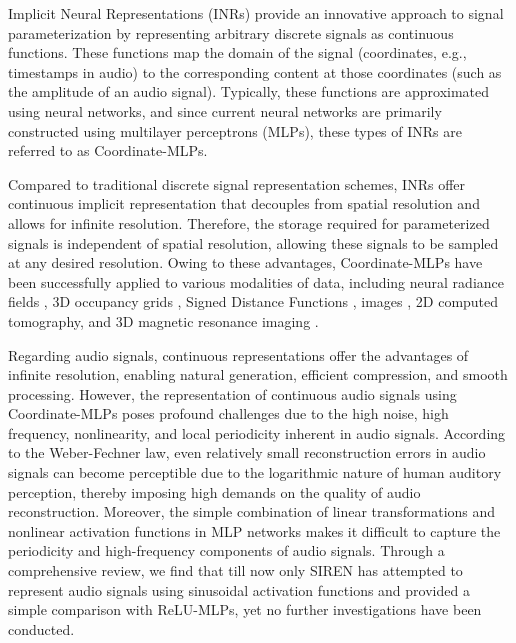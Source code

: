 \documentclass[letterpaper]{article} %
\begin{document}
Implicit Neural Representations (INRs) provide an innovative approach to signal parameterization by representing arbitrary discrete signals as continuous functions. These functions map the domain of the signal (coordinates, e.g., timestamps in audio) to the corresponding content at those coordinates (such as the amplitude of an audio signal). Typically, these functions are approximated using neural networks, and since current neural networks are primarily constructed using multilayer perceptrons (MLPs), these types of INRs are referred to as Coordinate-MLPs.

Compared to traditional discrete signal representation schemes, INRs offer continuous implicit representation that decouples from spatial resolution and allows for infinite resolution. Therefore, the storage required for parameterized signals is independent of spatial resolution, allowing these signals to be sampled at any desired resolution. Owing to these advantages, Coordinate-MLPs have been successfully applied to various modalities of data, including neural radiance fields \cite{mildenhall2020nerf}, 3D occupancy grids \cite{mescheder2019occupancynet}, Signed Distance Functions \cite{park2019deepsdf}, images \cite{sitzmann2020siren}, 2D computed tomography, and 3D magnetic resonance imaging \cite{tancik2020ffn, saragadam2023wire, kazerouni2023incode}.

Regarding audio signals, continuous representations offer the advantages of infinite resolution, enabling natural generation, efficient compression, and smooth processing. However, the representation of continuous audio signals using Coordinate-MLPs poses profound challenges due to the high noise, high frequency, nonlinearity, and local periodicity inherent in audio signals. According to the Weber-Fechner law, even relatively small reconstruction errors in audio signals can become perceptible due to the logarithmic nature of human auditory perception, thereby imposing high demands on the quality of audio reconstruction. Moreover, the simple combination of linear transformations and nonlinear activation functions in MLP networks makes it difficult to capture the periodicity and high-frequency components of audio signals. Through a comprehensive review, we find that till now only SIREN \cite{sitzmann2020siren} has attempted to represent audio signals using sinusoidal activation functions and provided a simple comparison with ReLU-MLPs, yet no further investigations have been conducted. 
\end{document}
